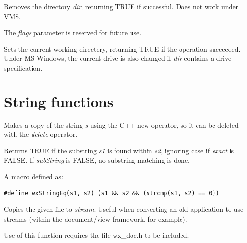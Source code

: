 Removes the directory {\it dir}, returning TRUE if successful. Does not work under VMS.

The {\it flags} parameter is reserved for future use.



Sets the current working directory, returning TRUE if the operation succeeded.
Under MS Windows, the current drive is also changed if {\it dir} contains a drive specification.

\section{String functions}



Makes a copy of the string {\it s} using the C++ new operator, so it can be
deleted with the {\it delete} operator.



Returns TRUE if the substring {\it s1} is found within {\it s2},
ignoring case if {\it exact} is FALSE. If {\it subString} is FALSE,
no substring matching is done.

\label{wxstringeq}


A macro defined as:

\begin{verbatim}
#define wxStringEq(s1, s2) (s1 && s2 && (strcmp(s1, s2) == 0))
\end{verbatim}

\label{wxtransferfiletostream}


Copies the given file to {\it stream}. Useful when converting an old application to
use streams (within the document/view framework, for example).

Use of this function requires the file wx\_doc.h to be included.

